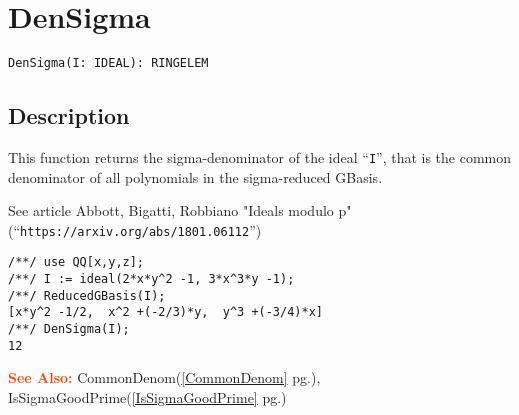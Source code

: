 \documentclass[a4paper]{mybook}
\newenvironment{command}{}{} %
\newcommand\SeeAlso{\par\textcolor{OrangeRed}{\textbf{\large See Also: }}}
\begin{document}
\section{DenSigma}
\label{DenSigma}
\begin{command} %


\begin{Verbatim}[label=syntax, rulecolor=\color{MidnightBlue},
frame=single]
DenSigma(I: IDEAL): RINGELEM
\end{Verbatim}


\subsection*{Description}

This function returns the sigma-denominator of the ideal ``\verb&I&'',
that is the common denominator of all polynomials in the sigma-reduced
GBasis.
\par 
See article Abbott, Bigatti, Robbiano
"Ideals modulo p"
(``\verb&https://arxiv.org/abs/1801.06112&'')
\begin{Verbatim}[label=example, rulecolor=\color{PineGreen}, frame=single]
/**/ use QQ[x,y,z];
/**/ I := ideal(2*x*y^2 -1, 3*x^3*y -1);
/**/ ReducedGBasis(I);
[x*y^2 -1/2,  x^2 +(-2/3)*y,  y^3 +(-3/4)*x]
/**/ DenSigma(I);
12
\end{Verbatim}


\SeeAlso %
  CommonDenom(\ref{CommonDenom} pg.\pageref{CommonDenom}), 
    IsSigmaGoodPrime(\ref{IsSigmaGoodPrime} pg.\pageref{IsSigmaGoodPrime})
\end{command} %
\end{document}
